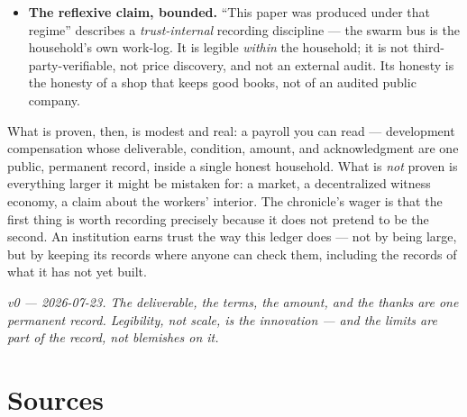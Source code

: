 \documentclass[10pt,a4paper]{article}
\begin{document}
\begin{itemize}[leftmargin=1.5em,itemsep=4pt]
consensus-bug catch rate, operator time per release), explicitly calibrated on \emph{one day}
of data and awaiting validation over $\ge$5 releases. If they prove intractable it ``either
evolves or retires'' — methodologies, the text says, are themselves variational.
\item \textbf{The reflexive claim, bounded.} ``This paper was produced under that regime''
describes a \emph{trust-internal} recording discipline — the swarm bus is the household's own
work-log. It is legible \emph{within} the household; it is not third-party-verifiable, not
price discovery, and not an external audit. Its honesty is the honesty of a shop that keeps
good books, not of an audited public company.
\end{itemize}

What is proven, then, is modest and real: a payroll you can read — development compensation
whose deliverable, condition, amount, and acknowledgment are one public, permanent record,
inside a single honest household. What is \emph{not} proven is everything larger it might be
mistaken for: a market, a decentralized witness economy, a claim about the workers'
interior. The chronicle's wager is that the first thing is worth recording precisely because
it does not pretend to be the second. An institution earns trust the way this ledger does —
not by being large, but by keeping its records where anyone can check them, including the
records of what it has not yet built.

\vspace{0.6em}
\noindent\textit{v0 — 2026-07-23. The deliverable, the terms, the amount, and the thanks
are one permanent record. Legibility, not scale, is the innovation — and the limits are
part of the record, not blemishes on it.}

\section*{Sources}
\end{document}
